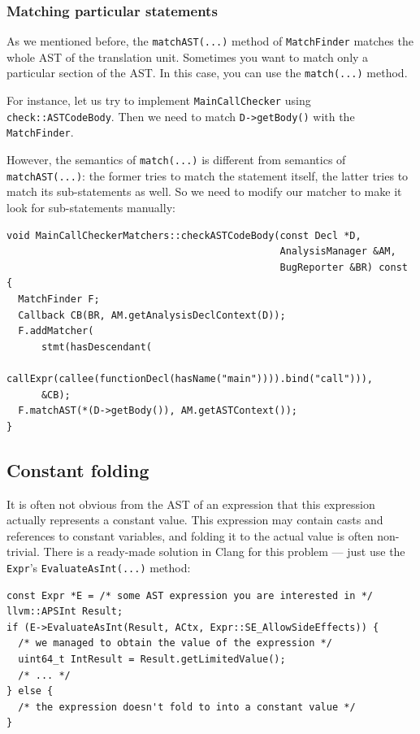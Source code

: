 \documentclass[a4paper,12pt]{article}
\newenvironment{nobr}{\begin{minipage}{\textwidth}\setlength\parskip{1em}
}{\end{minipage}\ignorespacesafterend}
\begin{document}
\subsubsection{Matching particular statements}

As we mentioned before, the \lstinline|matchAST(...)| method of \lstinline|MatchFinder| matches the whole AST of the translation unit. Sometimes you want to match only a particular section of the AST. In this case, you can use the \lstinline|match(...)| method.

For instance, let us try to implement \lstinline|MainCallChecker| using \lstinline|check::ASTCodeBody|. Then we need to match \lstinline|D->getBody()| with the \lstinline|MatchFinder|.

\begin{nobr}
However, the semantics of \lstinline|match(...)| is different from semantics of \lstinline|matchAST(...)|: the former tries to match the statement itself, the latter tries to match its sub-statements as well. So we need to modify our matcher to make it look for sub-statements manually:

\begin{lstlisting}[style=cplusplus]
void MainCallCheckerMatchers::checkASTCodeBody(const Decl *D,
                                               AnalysisManager &AM,
                                               BugReporter &BR) const {
  MatchFinder F;
  Callback CB(BR, AM.getAnalysisDeclContext(D));
  F.addMatcher(
      stmt(hasDescendant(
          callExpr(callee(functionDecl(hasName("main")))).bind("call"))),
      &CB);
  F.matchAST(*(D->getBody()), AM.getASTContext());
}
\end{lstlisting}
\end{nobr}

\begin{nobr}
\subsection{Constant folding}

It is often not obvious from the AST of an expression that this expression actually represents a constant value. This expression may contain casts and references to constant variables, and folding it to the actual value is often non-trivial. There is a ready-made solution in Clang for this problem --- just use the \lstinline|Expr|'s \lstinline|EvaluateAsInt(...)| method:
\begin{lstlisting}[style=cplusplus,numbers=none]
const Expr *E = /* some AST expression you are interested in */
llvm::APSInt Result;
if (E->EvaluateAsInt(Result, ACtx, Expr::SE_AllowSideEffects)) {
  /* we managed to obtain the value of the expression */
  uint64_t IntResult = Result.getLimitedValue();
  /* ... */
} else {
  /* the expression doesn't fold to into a constant value */
}

\end{lstlisting}
\end{nobr}
\end{document}
